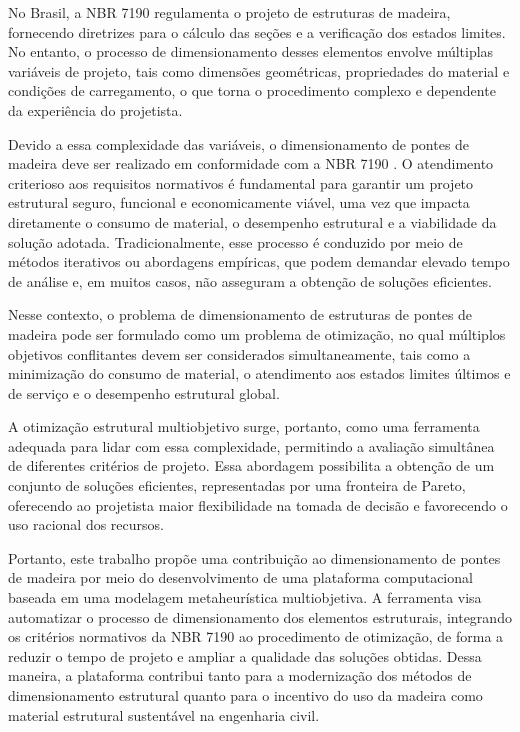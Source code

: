 No Brasil, a NBR 7190 \parencite{NBR7190-1:2022} regulamenta o projeto de estruturas de madeira, fornecendo diretrizes para o cálculo das seções e a verificação dos estados limites. No entanto, o processo de dimensionamento desses elementos envolve múltiplas variáveis de projeto, tais como dimensões geométricas, propriedades do material e condições de carregamento, o que torna o procedimento complexo e dependente da experiência do projetista.

Devido a essa complexidade das variáveis, o dimensionamento de pontes de madeira deve ser realizado em conformidade com a NBR 7190 \parencite{NBR7190-1:2022}. O atendimento criterioso aos requisitos normativos é fundamental para garantir um projeto estrutural seguro, funcional e economicamente viável, uma vez que impacta diretamente o consumo de material, o desempenho estrutural e a viabilidade da solução adotada. Tradicionalmente, esse processo é conduzido por meio de métodos iterativos ou abordagens empíricas, que podem demandar elevado tempo de análise e, em muitos casos, não asseguram a obtenção de soluções eficientes.

Nesse contexto, o problema de dimensionamento de estruturas de pontes de madeira pode ser formulado como um problema de otimização, no qual múltiplos objetivos conflitantes devem ser considerados simultaneamente, tais como a minimização do consumo de material, o atendimento aos estados limites últimos e de serviço e o desempenho estrutural global. 

A otimização estrutural multiobjetivo surge, portanto, como uma ferramenta adequada para lidar com essa complexidade, permitindo a avaliação simultânea de diferentes critérios de projeto. Essa abordagem possibilita a obtenção de um conjunto de soluções eficientes, representadas por uma fronteira de Pareto, oferecendo ao projetista maior flexibilidade na tomada de decisão e favorecendo o uso racional dos recursos.

Portanto, este trabalho propõe uma contribuição ao dimensionamento de pontes de madeira por meio do desenvolvimento de uma plataforma computacional baseada em uma modelagem metaheurística multiobjetiva. A ferramenta visa automatizar o processo de dimensionamento dos elementos estruturais, integrando os critérios normativos da NBR 7190 \parencite{NBR7190-1:2022} ao procedimento de otimização, de forma a reduzir o tempo de projeto e ampliar a qualidade das soluções obtidas. Dessa maneira, a plataforma contribui tanto para a modernização dos métodos de dimensionamento estrutural quanto para o incentivo do uso da madeira como material estrutural sustentável na engenharia civil.

